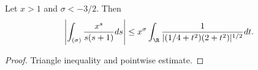 \begin{lemma}[vertIntBoundLeft]
\label{vertIntBoundLeft}
\leanok
Let $x>1$ and $\sigma<-3/2$. Then
  $$\left|
  \int_{(\sigma)}\frac{x^s}{s(s+1)}ds\right| \leq
    x^\sigma \int_\R\frac{1}{|(1/4+t ^ 2)(2+t ^ 2)|^{1/2}}dt.$$
\end{lemma}
\begin{proof}
\leanok
Triangle inequality and pointwise estimate.
\end{proof}

